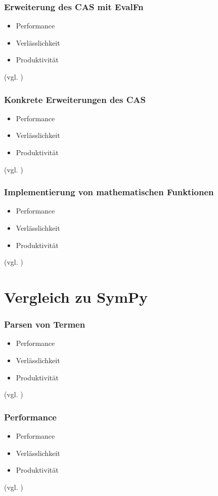 \documentclass{beamer}
\begin{document}
\begin{frame}[fragile]
  \frametitle{Erweiterung des CAS mit EvalFn}
  \begin{itemize}
    \item Performance
    \pause
    \item Verlässlichkeit
    \pause
    \item Produktivität
  \end{itemize}
  {\small (vgl. \cite{WhyRust})}
\end{frame}

\begin{frame}[fragile]
  \frametitle{Konkrete Erweiterungen des CAS}
  \begin{itemize}
    \item Performance
    \pause
    \item Verlässlichkeit
    \pause
    \item Produktivität
  \end{itemize}
  {\small (vgl. \cite{WhyRust})}
\end{frame}

\begin{frame}[fragile]
  \frametitle{Implementierung von mathematischen Funktionen}
  \begin{itemize}
    \item Performance
    \pause
    \item Verlässlichkeit
    \pause
    \item Produktivität
  \end{itemize}
  {\small (vgl. \cite{WhyRust})}
\end{frame}

\section{Vergleich zu SymPy}
\begin{frame}[fragile]
  \frametitle{Parsen von Termen}
  \begin{itemize}
    \item Performance
    \pause
    \item Verlässlichkeit
    \pause
    \item Produktivität
  \end{itemize}
  {\small (vgl. \cite{WhyRust})}
\end{frame}

\begin{frame}[fragile]
  \frametitle{Performance}
  \begin{itemize}
    \item Performance
    \pause
    \item Verlässlichkeit
    \pause
    \item Produktivität
  \end{itemize}
  {\small (vgl. \cite{WhyRust})}
\end{frame}
\end{document}
